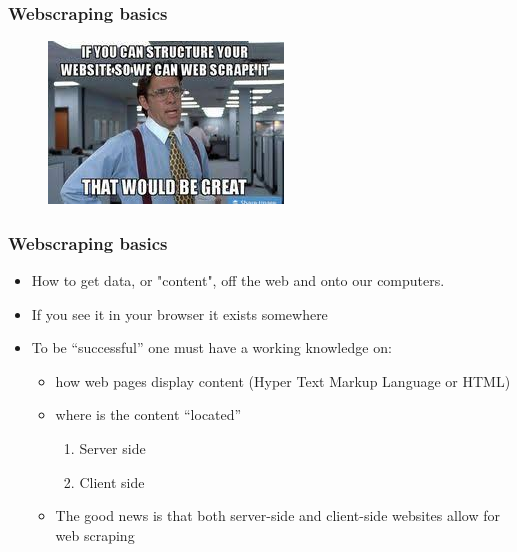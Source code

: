 \documentclass[
  shownotes,
  xcolor={svgnames},
  hyperref={colorlinks,citecolor=DarkBlue,linkcolor=DarkRed,urlcolor=DarkBlue}
  , aspectratio=169]{beamer}
\begin{document}

\begin{frame}
\frametitle{Webscraping basics}

\begin{figure}[H] \centering
  \centering
  \includegraphics[scale=0.75]{figures/webscrape_it.jpg}
  \\
  \tiny
\end{figure}

\end{frame}

\begin{frame}
\frametitle{Webscraping basics}

\begin{itemize}
  \item How to get data, or "content", off the web and onto our computers.
  \bigskip
  \item If you see it in your browser it exists somewhere
  \bigskip
  \item To be ``successful'' one must have a working knowledge on:
  \begin{itemize}
  \item how web pages display content (Hyper Text Markup Language or HTML)
  \medskip
  \item where is the content ``located''


    \begin{enumerate}
    \item Server side
    \medskip
    \item Client side
    \medskip

    \end{enumerate}
    \item The good news is that both server-side and client-side websites allow for web scraping
   \end{itemize}
\end{itemize}


\end{frame}
\end{document}
